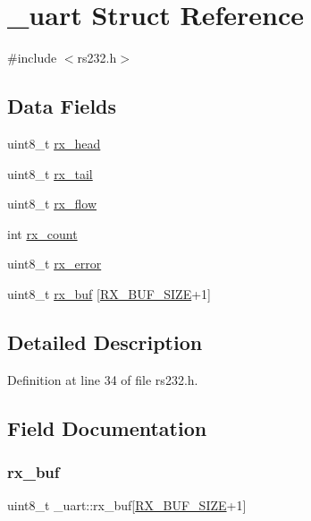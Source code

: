 \hypertarget{struct__uart}{}\section{\+\_\+uart Struct Reference}
\label{struct__uart}


{\ttfamily \#include $<$rs232.\+h$>$}

\subsection*{Data Fields}
\begin{DoxyCompactItemize}
\item 
uint8\+\_\+t \hyperlink{struct__uart_add14728bfbde14b7c260c8ff09bcd91b}{rx\+\_\+head}
\item 
uint8\+\_\+t \hyperlink{struct__uart_a4bd6a544526fe5ac94a5f9af09e3bbeb}{rx\+\_\+tail}
\item 
uint8\+\_\+t \hyperlink{struct__uart_a193691b69079880daf5b5b9894fb6aa5}{rx\+\_\+flow}
\item 
int \hyperlink{struct__uart_a50b344402c339343e3f32c82358e190c}{rx\+\_\+count}
\item 
uint8\+\_\+t \hyperlink{struct__uart_a6c0b44754c36dd831e1da4f02b124167}{rx\+\_\+error}
\item 
uint8\+\_\+t \hyperlink{struct__uart_a68a8939d4be8a563157c98b5baa50ae0}{rx\+\_\+buf} \mbox{[}\hyperlink{rs232_8h_a690f985c933da2ce6fe62b6c61dfa662}{R\+X\+\_\+\+B\+U\+F\+\_\+\+S\+I\+ZE}+1\mbox{]}
\end{DoxyCompactItemize}


\subsection{Detailed Description}


Definition at line 34 of file rs232.\+h.



\subsection{Field Documentation}
\mbox{\label{struct__uart_a68a8939d4be8a563157c98b5baa50ae0}} 
\subsubsection{\texorpdfstring{rx\+\_\+buf}{rx\_buf}}
{\footnotesize\ttfamily uint8\+\_\+t \+\_\+uart\+::rx\+\_\+buf\mbox{[}\hyperlink{rs232_8h_a690f985c933da2ce6fe62b6c61dfa662}{R\+X\+\_\+\+B\+U\+F\+\_\+\+S\+I\+ZE}+1\mbox{]}}



